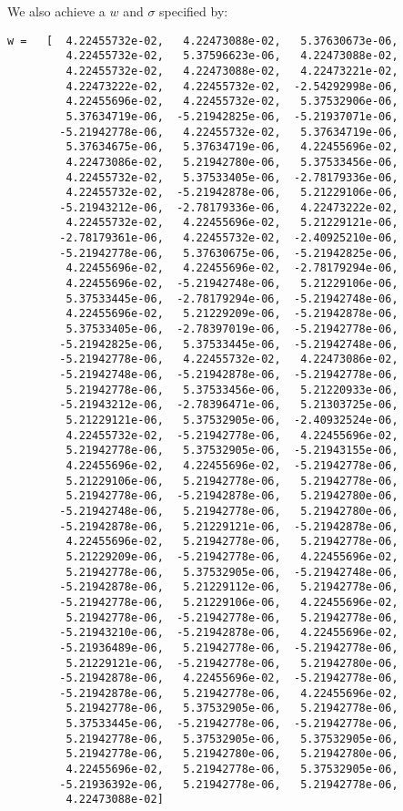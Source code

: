 \documentclass{harvardml}
\theoremstyle{plain}
\begin{document}
\begin{enumerate}
We also achieve a $w$ and $\sigma$ specified by:
\begin{verbatim}
w =   [  4.22455732e-02,   4.22473088e-02,   5.37630673e-06,
         4.22455732e-02,   5.37596623e-06,   4.22473088e-02,
         4.22455732e-02,   4.22473088e-02,   4.22473221e-02,
         4.22473222e-02,   4.22455732e-02,  -2.54292998e-06,
         4.22455696e-02,   4.22455732e-02,   5.37532906e-06,
         5.37634719e-06,  -5.21942825e-06,  -5.21937071e-06,
        -5.21942778e-06,   4.22455732e-02,   5.37634719e-06,
         5.37634675e-06,   5.37634719e-06,   4.22455696e-02,
         4.22473086e-02,   5.21942780e-06,   5.37533456e-06,
         4.22455732e-02,   5.37533405e-06,  -2.78179336e-06,
         4.22455732e-02,  -5.21942878e-06,   5.21229106e-06,
        -5.21943212e-06,  -2.78179336e-06,   4.22473222e-02,
         4.22455732e-02,   4.22455696e-02,   5.21229121e-06,
        -2.78179361e-06,   4.22455732e-02,  -2.40925210e-06,
        -5.21942778e-06,   5.37630675e-06,  -5.21942825e-06,
         4.22455696e-02,   4.22455696e-02,  -2.78179294e-06,
         4.22455696e-02,  -5.21942748e-06,   5.21229106e-06,
         5.37533445e-06,  -2.78179294e-06,  -5.21942748e-06,
         4.22455696e-02,   5.21229209e-06,  -5.21942878e-06,
         5.37533405e-06,  -2.78397019e-06,  -5.21942778e-06,
        -5.21942825e-06,   5.37533445e-06,  -5.21942748e-06,
        -5.21942778e-06,   4.22455732e-02,   4.22473086e-02,
        -5.21942748e-06,  -5.21942878e-06,  -5.21942778e-06,
         5.21942778e-06,   5.37533456e-06,   5.21220933e-06,
        -5.21943212e-06,  -2.78396471e-06,   5.21303725e-06,
         5.21229121e-06,   5.37532905e-06,  -2.40932524e-06,
         4.22455732e-02,  -5.21942778e-06,   4.22455696e-02,
         5.21942778e-06,   5.37532905e-06,  -5.21943155e-06,
         4.22455696e-02,   4.22455696e-02,  -5.21942778e-06,
         5.21229106e-06,   5.21942778e-06,   5.21942778e-06,
         5.21942778e-06,  -5.21942878e-06,   5.21942780e-06,
        -5.21942748e-06,   5.21942778e-06,   5.21942780e-06,
        -5.21942878e-06,   5.21229121e-06,  -5.21942878e-06,
         4.22455696e-02,   5.21942778e-06,   5.21942778e-06,
         5.21229209e-06,  -5.21942778e-06,   4.22455696e-02,
         5.21942778e-06,   5.37532905e-06,  -5.21942748e-06,
        -5.21942878e-06,   5.21229112e-06,   5.21942778e-06,
        -5.21942778e-06,   5.21229106e-06,   4.22455696e-02,
         5.21942778e-06,  -5.21942778e-06,   5.21942778e-06,
        -5.21943210e-06,  -5.21942878e-06,   4.22455696e-02,
        -5.21936489e-06,   5.21942778e-06,  -5.21942778e-06,
         5.21229121e-06,  -5.21942778e-06,   5.21942780e-06,
        -5.21942878e-06,   4.22455696e-02,  -5.21942778e-06,
        -5.21942878e-06,   5.21942778e-06,   4.22455696e-02,
         5.21942778e-06,   5.37532905e-06,   5.21942778e-06,
         5.37533445e-06,  -5.21942778e-06,  -5.21942778e-06,
         5.21942778e-06,   5.37532905e-06,   5.37532905e-06,
         5.21942778e-06,   5.21942780e-06,   5.21942780e-06,
         4.22455696e-02,   5.21942778e-06,   5.37532905e-06,
        -5.21936392e-06,   5.21942778e-06,   5.21942778e-06,
         4.22473088e-02]


\end{verbatim}
\end{enumerate}
\end{document}

